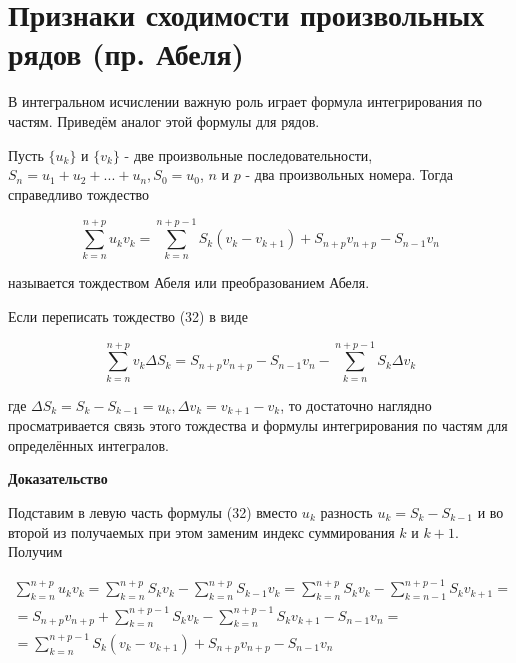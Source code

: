 \section{Признаки сходимости произвольных рядов (пр. Абеля)}

В интегральном исчислении важную роль играет формула интегрирования по частям. Приведём аналог этой формулы для рядов.

\begin{statm}
	Пусть $\{u_k\}$ и $\{v_k\}$ - две произвольные последовательности, $S_n = u_1 + u_2 + ... + u_n, S_0 = u_0$, $n$ и $p$ - два произвольных номера. Тогда справедливо тождество
	
	\begin{equation}
		\displaystyle\sum_{k = n}^{n + p} u_kv_k = \displaystyle\sum_{k = n}^{n + p - 1} S_k (v_k - v_{k + 1}) + S_{n + p}v_{n + p} - S_{n - 1}v_n
	\end{equation}
	
	называется тождеством Абеля или преобразованием Абеля.
	
	Если переписать тождество (32) в виде
	
	\begin{equation*}
		\displaystyle\sum_{k = n}^{n + p} v_k\Delta S_k = S_{n + p}v_{n + p} - S_{n - 1}v_n - \displaystyle\sum_{k = n}^{n + p -1} S_k\Delta v_k
	\end{equation*}
	
	где $\Delta S_k = S_k - S_{k - 1} = u_k, \Delta v_k = v_{k + 1} - v_k$, то достаточно наглядно просматривается связь этого тождества и формулы интегрирования по частям для определённых интегралов.
\end{statm}
\textbf{Доказательство}

Подставим в левую часть формулы (32)  вместо $u_k$ разность $u_k = S_k - S_{k - 1}$ и во второй из получаемых при этом заменим индекс суммирования $k$ и $k + 1$. Получим

\begin{equation*}
	\begin{gathered}
		\displaystyle\sum_{k = n}^{n + p}u_kv_k = \displaystyle\sum_{k = n}^{n + p}S_kv_k - \displaystyle\sum_{k = n}^{n + p} S_{k -1}v_k = \displaystyle\sum_{k = n}^{n + p}S_kv_k - \displaystyle\sum_{k = n - 1}^{n + p - 1} S_k v_{k + 1} = \\
		= S_{n + p}v_{n + p} + \displaystyle\sum_{k = n}^{n + p - 1}S_kv_k - \displaystyle\sum_{k = n}^{n + p - 1} S_kv_{k + 1} - S_{n - 1}v_n = \\
		= \displaystyle\sum_{k = n}^{n + p - 1} S_k(v_k - v_{k + 1}) + S_{n + p}v_{n + p} - S_{n - 1}v_n
	\end{gathered}
\end{equation*}

